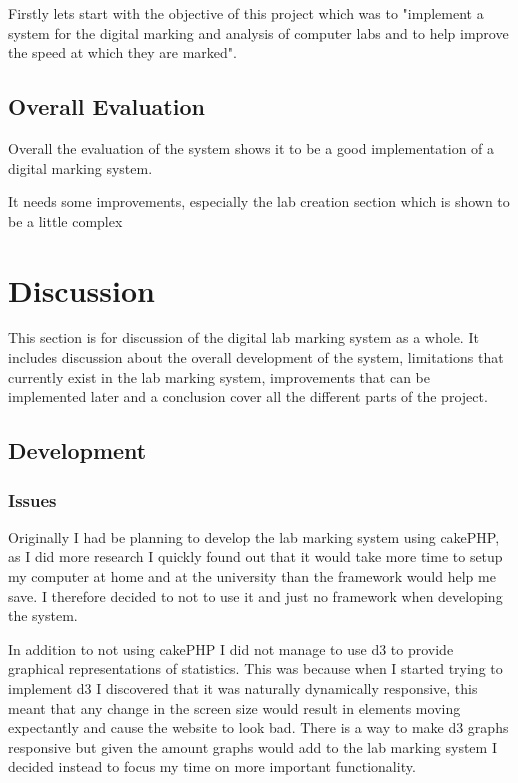 \documentclass[12pt]{article}  %
\begin{document}
Firstly lets start with the objective of this project which was to "implement  a  system  for  the  digital  marking  and analysis of computer labs and to help improve the speed at which they are marked". 


\subsection{Overall Evaluation}

Overall the evaluation of the system shows it to be a good implementation of a digital marking system. 

It needs some improvements, especially the lab creation section which is shown to be a little complex

\newpage
\section{Discussion}

This section is for discussion of the digital lab marking system as a whole. It includes discussion about the overall development of the system, limitations that currently exist in the lab marking system, improvements that can be implemented later and a conclusion cover all the different parts of the project.

\subsection{Development}

\subsubsection{Issues}

Originally I had be planning to develop the lab marking system using cakePHP, as I did more research I quickly found out that it would take more time to setup my computer at home and at the university than the framework would help me save. I therefore decided to not to use it and just no framework when developing the system.

In addition to not using cakePHP I did not manage to use d3 to provide graphical representations of statistics. This was because when I started trying to implement d3 I discovered that it was naturally dynamically responsive, this meant that any change in the screen size would result in elements moving expectantly and cause the website to look bad. There is a way to make d3 graphs responsive but given the amount graphs would add to the lab marking system I decided instead to focus my time on more important functionality. 
\end{document}
